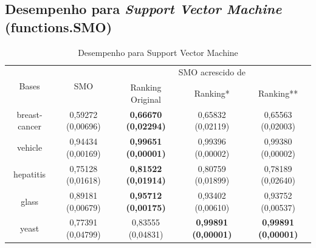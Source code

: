 \clearpage
\pagebreak


\subsection{Desempenho para \emph{Support Vector Machine} (functions.SMO)}

\begin{table}[h!]
    \begin{tabular}{ c c c c c }
        \hline

        \multirow{2}{*}{Bases} & \multirow{2}{*}{SMO} & \multicolumn{3}{c}{SMO acrescido de} \\ \cline{3-5}
        & & {\small Ranking Original} & {\small Ranking*} & {\small  Ranking**} \\
        
        \hline
        
        breast-cancer & {\small 0,59272 (0,00696)} & {\small \textbf{0,66670 (0,02294)}} & {\small 0,65832 (0,02119)} & {\small 0,65563 (0,02003)} \\
        vehicle & {\small 0,94434 (0,00169)} & {\small \textbf{0,99651 (0,00001)}} & {\small 0,99396 (0,00002)} & {\small 0,99380 (0,00002)} \\
        hepatitis & {\small 0,75128 (0,01618)} & {\small \textbf{0,81522 (0,01914)}} & {\small 0,80759 (0,01899)} & {\small 0,78189 (0,02640)} \\
        glass & {\small 0,89181 (0,00679)} & {\small \textbf{0,95712 (0,00175)}} & {\small 0,93402 (0,00610)} & {\small 0,93752 (0,00537)} \\
        yeast & {\small 0,77391 (0,04799)} & {\small 0,83555 (0,04831)} & {\small \textbf{0,99891 (0,00001)}} & {\small \textbf{0,99891 (0,00001)}} \\
    
        \hline
    \end{tabular}
    
    \caption{Desempenho para Support Vector Machine}
    \label{smo_results_table}
\end{table}

